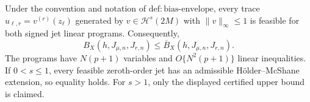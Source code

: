 Under the convention and notation of \(\mathrm{def:bias\text{-}envelope}\), every trace \(u_{\ell,r}=v^{(r)}(z_\ell)\) generated by \(v\in\mathcal H^s(2M)\) with \(\|v\|_\infty\le1\) is feasible for both signed jet linear programs. Consequently,
\[
B_X(h,J_{\mu,n},J_{r,n})\le\overline B_X(h,J_{\mu,n},J_{r,n}).
\]
The programs have \(N(p+1)\) variables and \(O\{N^2(p+1)\}\) linear inequalities. If \(0<s\le1\), every feasible zeroth-order jet has an admissible H\"older--McShane extension, so equality holds. For \(s>1\), only the displayed certified upper bound is claimed.